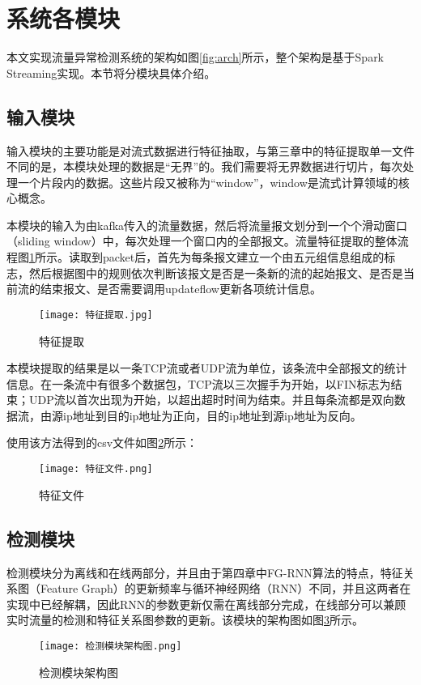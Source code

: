 \section{系统各模块}
本文实现流量异常检测系统的架构如图\ref{fig:arch}所示，整个架构是基于Spark Streaming实现。本节将分模块具体介绍。
\subsection{输入模块}
输入模块的主要功能是对流式数据进行特征抽取，与第三章中的特征提取单一文件不同的是，本模块处理的数据是“无界”的。我们需要将无界数据进行切片，每次处理一个片段内的数据。这些片段又被称为“window”，window是流式计算领域的核心概念。

本模块的输入为由kafka传入的流量数据，然后将流量报文划分到一个个滑动窗口（sliding window）中，每次处理一个窗口内的全部报文。流量特征提取的整体流程图\ref{fig:特征提取}所示。读取到packet后，首先为每条报文建立一个由五元组信息组成的标志，然后根据图中的规则依次判断该报文是否是一条新的流的起始报文、是否是当前流的结束报文、是否需要调用updateflow更新各项统计信息。

\begin{figure}
  \centering
  \texttt{[image: 特征提取.jpg]}
  \caption{特征提取}
  \label{fig:特征提取}
\end{figure}

本模块提取的结果是以一条TCP流或者UDP流为单位，该条流中全部报文的统计信息。在一条流中有很多个数据包，TCP流以三次握手为开始，以FIN标志为结束；UDP流以首次出现为开始，以超出超时时间为结束。并且每条流都是双向数据流，由源ip地址到目的ip地址为正向，目的ip地址到源ip地址为反向。

使用该方法得到的csv文件如图\ref{fig:特征文件}所示：
\begin{figure}
    \centering
    \texttt{[image: 特征文件.png]}
    \caption{特征文件}
    \label{fig:特征文件}
  \end{figure}


\subsection{检测模块}
检测模块分为离线和在线两部分，并且由于第四章中FG-RNN算法的特点，特征关系图（Feature Graph）的更新频率与循环神经网络（RNN）不同，并且这两者在实现中已经解耦，因此RNN的参数更新仅需在离线部分完成，在线部分可以兼顾实时流量的检测和特征关系图参数的更新。该模块的架构图如图\ref{fig:检测模块架构图}所示。
\begin{figure}
  \centering
  \texttt{[image: 检测模块架构图.png]}
  \caption{检测模块架构图}
  \label{fig:检测模块架构图}
\end{figure}


